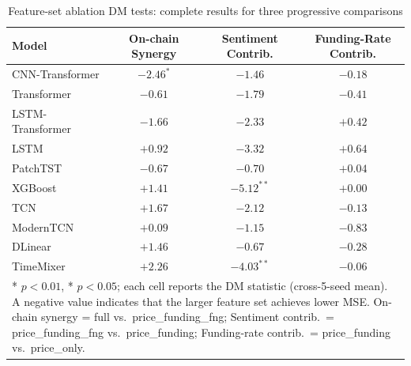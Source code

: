 \begin{table}[t]
\centering
\caption{Feature-set ablation DM tests: complete results for three progressive comparisons}
\label{tab:dm_feature_sets_full}
\footnotesize
\setlength{\tabcolsep}{2.5pt}
\begin{tabular}{lccc}
\toprule
Model & On-chain Synergy & Sentiment Contrib. & Funding-Rate Contrib. \\
\midrule
CNN-Transformer & $-2.46^{*}$ & $-1.46$ & $-0.18$ \\
Transformer & $-0.61$ & $-1.79$ & $-0.41$ \\
LSTM-Transformer & $-1.66$ & $-2.33$ & $+0.42$ \\
LSTM & $+0.92$ & $-3.32$ & $+0.64$ \\
PatchTST & $-0.67$ & $-0.70$ & $+0.04$ \\
XGBoost & $+1.41$ & $-5.12^{**}$ & $+0.00$ \\
TCN & $+1.67$ & $-2.12$ & $-0.13$ \\
ModernTCN & $+0.09$ & $-1.15$ & $-0.83$ \\
DLinear & $+1.46$ & $-0.67$ & $-0.28$ \\
TimeMixer & $+2.26$ & $-4.03^{**}$ & $-0.06$ \\
\bottomrule
\multicolumn{4}{p{0.85\textwidth}}{\footnotesize ** $p<0.01$, * $p<0.05$; each cell reports the DM statistic (cross-5-seed mean). A negative value indicates that the larger feature set achieves lower MSE. On-chain synergy = full vs.\ price\_funding\_fng; Sentiment contrib.\ = price\_funding\_fng vs.\ price\_funding; Funding-rate contrib.\ = price\_funding vs.\ price\_only.} \\
\end{tabular}
\end{table}
